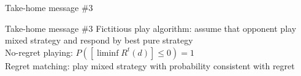 \begin{frame}{Take-home message \#3}
    \begin{block}{Take-home message \#3}
        Fictitious play algorithm: assume that opponent play mixed strategy and respond by best pure strategy\\
        No-regret playing: $P([\liminf R^t(d)]\leq 0)=1$\\
        Regret matching: play mixed strategy with probability consistent with regret
    \end{block}
\end{frame}
